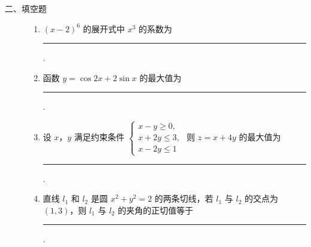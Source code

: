 \begin{description}

    \item[二、填空题]

    \begin{enumerate}[leftmargin=5pt]

      \addtocounter{enumi}{+12}

        \item \((x - 2)^{6}\) 的展开式中 \(x^{3}\) 的系数为\rule[-0.3ex]{3em}{0.4pt}.

        \item 函数 \( y = \cos 2x + 2\sin x \) 的最大值为\rule[-0.3ex]{3em}{0.4pt}.

        \item 设 \(x\)，\(y\) 满足约束条件 \(
\begin{cases}
x - y \geqslant 0, \\
x + 2y \leqslant 3, \\
x - 2y \leqslant 1
\end{cases}
\) 则 \(z = x + 4y\) 的最大值为\rule[-0.3ex]{3em}{0.4pt}.

        \item 直线 \(l_{1}\) 和 \(l_{2}\) 是圆 \(x^{2} + y^{2} = 2\) 的两条切线，若 \(l_{1}\) 与 \(l_{2}\) 的交点为 \((1,3)\)，则 \(l_{1}\) 与 \(l_{2}\) 的夹角的正切值等于\rule[-0.3ex]{3em}{0.4pt}.

    \end{enumerate}

\end{description}

